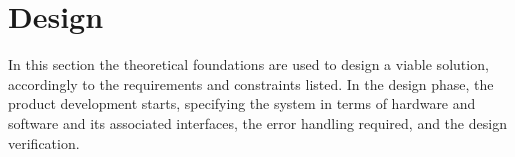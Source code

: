 \chapter{Design}
\label{ch:design}
In this section the theoretical foundations are used to design a viable
solution, accordingly to the requirements and constraints listed.
In the design phase, the product development starts, specifying the system in
terms of hardware and software and its associated interfaces, the error handling
required, and the design verification.
%
%




